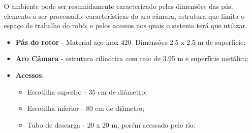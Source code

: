 O ambiente pode ser resumidamente caracterizado pelas dimensões das pás,
elemento a ser processado; características do aro câmara, estrutura que limita o
espaço de trabalho do robô; e pelos acessos nos quais o sistema terá que
utilizar.

\begin{itemize}
  \item \textbf{Pás do rotor} - Material aço inox 420. Dimensões 2.5 x 2.5 m de superfície;
  \item \textbf{Aro Câmara} - estrutura cilíndrica com raio de 3.95 m e
  superfície metálica;
  \item \textbf{Acessos}: 
  	\begin{itemize}
    	\item Escotilha superior - 35 cm de diâmetro;
  		\item Escotilha inferior - 80 cm de diâmetro;
  		\item Tubo de descarga - 20 x 20 m, porém acessado pelo rio. 
  	\end{itemize}
\end{itemize}






